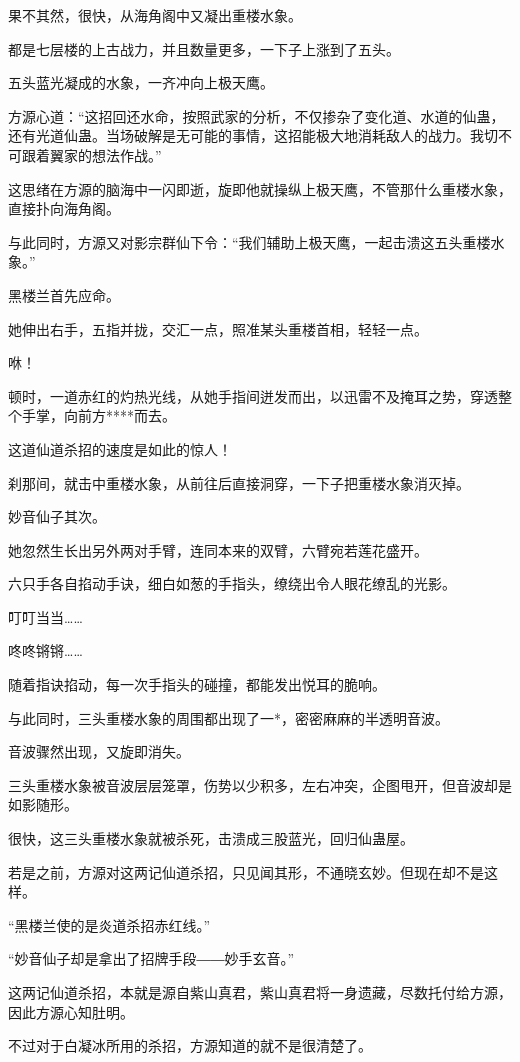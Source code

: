 \begin{this_body}
果不其然，很快，从海角阁中又凝出重楼水象。

都是七层楼的上古战力，并且数量更多，一下子上涨到了五头。

五头蓝光凝成的水象，一齐冲向上极天鹰。

方源心道：“这招回还水命，按照武家的分析，不仅掺杂了变化道、水道的仙蛊，还有光道仙蛊。当场破解是无可能的事情，这招能极大地消耗敌人的战力。我切不可跟着翼家的想法作战。”

这思绪在方源的脑海中一闪即逝，旋即他就操纵上极天鹰，不管那什么重楼水象，直接扑向海角阁。

与此同时，方源又对影宗群仙下令：“我们辅助上极天鹰，一起击溃这五头重楼水象。”

黑楼兰首先应命。

她伸出右手，五指并拢，交汇一点，照准某头重楼首相，轻轻一点。

咻！

顿时，一道赤红的灼热光线，从她手指间迸发而出，以迅雷不及掩耳之势，穿透整个手掌，向前方****而去。

这道仙道杀招的速度是如此的惊人！

刹那间，就击中重楼水象，从前往后直接洞穿，一下子把重楼水象消灭掉。

妙音仙子其次。

她忽然生长出另外两对手臂，连同本来的双臂，六臂宛若莲花盛开。

六只手各自掐动手诀，细白如葱的手指头，缭绕出令人眼花缭乱的光影。

叮叮当当……

咚咚锵锵……

随着指诀掐动，每一次手指头的碰撞，都能发出悦耳的脆响。

与此同时，三头重楼水象的周围都出现了一*，密密麻麻的半透明音波。

音波骤然出现，又旋即消失。

三头重楼水象被音波层层笼罩，伤势以少积多，左右冲突，企图甩开，但音波却是如影随形。

很快，这三头重楼水象就被杀死，击溃成三股蓝光，回归仙蛊屋。

若是之前，方源对这两记仙道杀招，只见闻其形，不通晓玄妙。但现在却不是这样。

“黑楼兰使的是炎道杀招赤红线。”

“妙音仙子却是拿出了招牌手段――妙手玄音。”

这两记仙道杀招，本就是源自紫山真君，紫山真君将一身遗藏，尽数托付给方源，因此方源心知肚明。

不过对于白凝冰所用的杀招，方源知道的就不是很清楚了。


\end{this_body}
